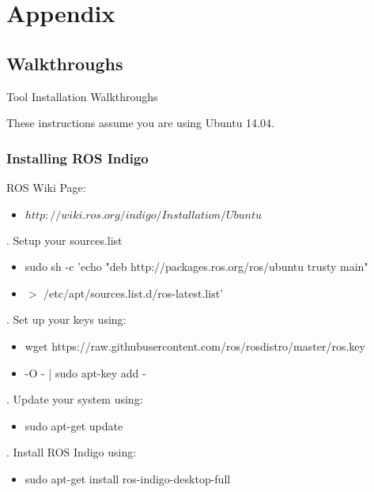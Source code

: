 
\chapter{Appendix}

\section{Walkthroughs}\label{walkthroughs}

\noindent Tool Installation Walkthroughs

\noindent These instructions assume you are using Ubuntu 14.04.


\subsection{Installing ROS Indigo}

\noindent ROS Wiki Page:
\begin{itemize}
	\item[]\href{http://wiki.ros.org/indigo/Installation/Ubuntu}{$http://wiki.ros.org/indigo/Installation/Ubuntu$}
\end{itemize}

. Setup your sources.list
\begin{itemize}
	\item[]sudo sh -c 'echo "deb http://packages.ros.org/ros/ubuntu trusty main"
	\item[] $>$ /etc/apt/sources.list.d/ros-latest.list'
\end{itemize}

. Set up your keys using:
\begin{itemize}
	\item[]wget https://raw.githubusercontent.com/ros/rosdistro/master/ros.key
	\item[] -O - | sudo apt-key add -
\end{itemize}

. Update your system using:
\begin{itemize}
	\item[]sudo apt-get update
\end{itemize}

. Install ROS Indigo using:
\begin{itemize}
	\item[]sudo apt-get install ros-indigo-desktop-full
\end{itemize}

